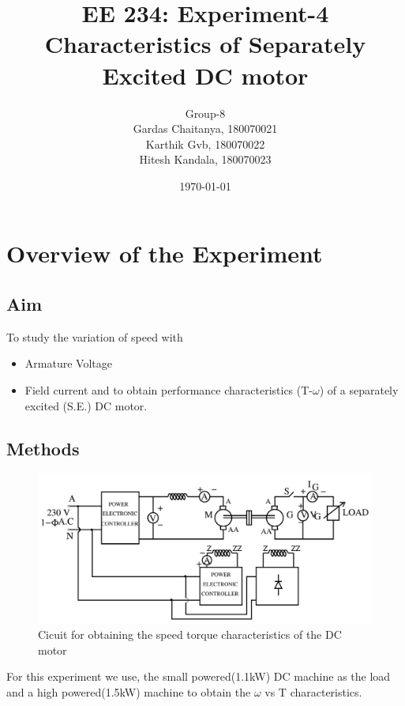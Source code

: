 \documentclass[12pt]{article}
\title{EE 234: Experiment-4\\
Characteristics of Separately Excited DC motor}
\author{Group-8 \\Gardas Chaitanya, 180070021  \\
Karthik Gvb, 180070022 \\
Hitesh Kandala, 180070023}
\date{\today}
\begin{document}
  \maketitle
  
    \section{Overview of the Experiment}
        \subsection{Aim}
            To study the variation of speed with
            \begin{itemize}
                \item Armature Voltage
                \item Field current
                and to obtain performance characteristics (T-$\omega$) of a separately excited (S.E.) DC motor.
            \end{itemize}
        \subsection{Methods}
        \begin{figure}[H]
            \centering
            \includegraphics[scale=0.44]{LAB-4/circuit.png}
            \caption{Cicuit for obtaining the speed torque characteristics of the DC motor} %
            \label{fig:my_label}
        \end{figure}
        For this experiment we use, the small powered(1.1kW) DC machine as the load and a high powered(1.5kW) machine to obtain the $\omega$ vs T characteristics.
    \clearpage
\end{document}

